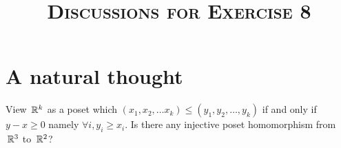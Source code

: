 
\title{\huge\textsc{Discussions for Exercise 8}}

\maketitle

\section{A natural thought}
 \begin{pro}
		 View $\,\mathbb{R}^{k}$ as a poset which $\left( x_1,x_2,\ldots x_{k}\right) \le 
		 \left( y_1,y_2,\ldots,y_{k} \right) $ if and only if
		 $y-x\ge 0$ namely $\forall i,y_i \ge  x_i$. Is there
		 any injective poset homomorphism from $\,\mathbb{R}^{3}$ to $\,\mathbb{R}^{2}$?
 \end{pro}



